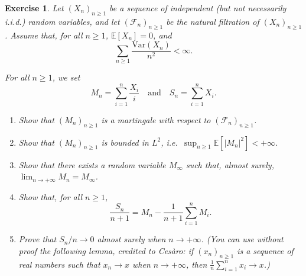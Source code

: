 \documentclass{article}
\newtheorem{exercise}[theorem]{Exercise}
\begin{document}
\begin{exercise}
Let $(X_n)_{n \geq 1}$ be a sequence of independent (but not necessarily i.i.d.) random variables, and let $(\mathcal{F}_n)_{n \geq 1}$ be the natural filtration of $(X_n)_{n \geq 1}$. Assume that, for all $n \geq 1$, $\mathbb{E}[X_n] = 0$, and
\[
\sum_{n \geq 1} \frac{\mathrm{Var}(X_n)}{n^2} < \infty.
\]

For all $n \geq 1$, we set
\[
M_n = \sum_{i=1}^n \frac{X_i}{i} \quad \text{and} \quad S_n = \sum_{i=1}^n X_i.
\]

\begin{enumerate}
\item[(i)] Show that $(M_n)_{n \geq 1}$ is a martingale with respect to $(\mathcal{F}_n)_{n \geq 1}$.

\item[(ii)] Show that $(M_n)_{n \geq 1}$ is bounded in $L^2$, i.e.\ $\sup_{n \geq 1} \mathbb{E}[|M_n|^2] < +\infty$.

\item[(iii)] Show that there exists a random variable $M_\infty$ such that, almost surely, $\lim_{n \to +\infty} M_n = M_\infty$.

\item[(iv)] Show that, for all $n \geq 1$,
\[
\frac{S_n}{n+1} = M_n - \frac{1}{n+1} \sum_{i=1}^n M_i.
\]

\item[(v)] Prove that $S_n/n \to 0$ almost surely when $n \to +\infty$. (You can use without proof the following lemma, credited to Cesàro: if $(x_n)_{n \geq 1}$ is a sequence of real numbers such that $x_n \to x$ when $n \to +\infty$, then $\frac{1}{n} \sum_{i=1}^n x_i \to x$.)
\end{enumerate}
\end{exercise}
\end{document}
